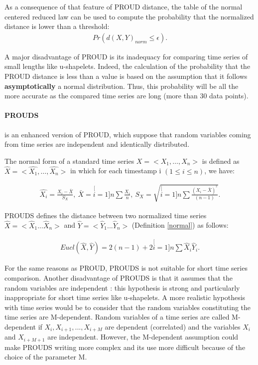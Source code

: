 As a consequence of that feature of PROUD distance,  the table of the normal centered reduced law can be used to compute the probability that the normalized distance is lower than a threshold:
\begin{eqnarray}
Pr(d(X,Y)_{norm}\leq\epsilon).
\end{eqnarray} 

A major disadvantage of PROUD is its inadequacy for comparing time series of small lengths like u-shapelets. Indeed, the calculation of the probability that the PROUD distance is less than a value is based on the assumption that it follows \textbf{asymptotically} a normal distribution.  Thus, this probability will be all the more accurate as the compared time series are long (more than 30 data points).


\paragraph{PROUDS}\cite{Orang2015} is an enhanced version of PROUD, which suppose that random variables coming from time series are independent and
identically distributed. 


\begin{definition}
\label{normal}
The normal form of a standard time series $X = <X_1, \ldots, X_n>$ is defined as
$\hat{X}=<\hat{X_{1}},\ldots,\hat{X_{n}}>$ in which for each timestamp i $(1 \leq i \leq n)$, we have:

\begin{eqnarray}
\hat{X_{i}}=\frac{X_{i}-\bar{X}}{S_{X}},\:\bar{X}=\stackrel[i=1]{n}{\sum}\frac{X_{i}}{n},\:S_{X}=\sqrt{\stackrel[i=1]{n}{\sum}\frac{(X_{i}-\bar{X})^{^{2}}}{(n-1)}}.
\end{eqnarray}
\label{normal}
\end{definition}



PROUDS defines the distance between two normalized time series  $\hat{X}=<\hat{X}_{1}...\hat{X}_{n}>$ and $\hat{Y}=<\hat{Y}_{1}...\hat{Y}_{n}>$ (Definition \ref{normal}) as follows:

\begin{eqnarray}
Eucl(\hat{X},\hat{Y})=2(n-1)+2\stackrel[i=1]{n}{\sum}\hat{X}_{i}\hat{Y}_{i}.
\end{eqnarray}

For the same reasons as PROUD, PROUDS is not suitable for short time series comparison. Another disadvantage of PROUDS is that it assumes that the random variables  are independent : this hypothesis is strong and particularly inappropriate for short time series like u-shapelets. A more realistic hypothesis with time series would be to consider that the random variables constituting the time series are M-dependent. Random variables of a time series are called M-dependent
 if $X_{i},X_{i+1},...,X_{i+M}$ are dependent (correlated) and the
variables $X_{i}$ and $X_{i+M+1}$ are independent. However, the M-dependent assumption could make PROUDS writing more complex and its use more difficult because of the choice of the parameter M. 


